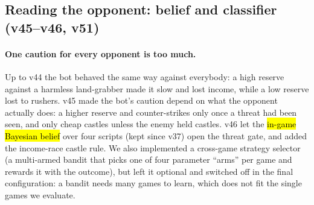 \subsection{Reading the opponent: belief and classifier (v45--v46, v51)}

\paragraph{One caution for every opponent is too much.} Up to v44 the bot behaved the same way against everybody:
a high reserve against a harmless land-grabber made it slow and lost income, while a low reserve lost to rushers.
v45 made the bot's caution depend on what the opponent actually does: a higher reserve and counter-strikes only
once a threat had been seen, and only cheap castles unless the enemy held castles. v46 let the \hl{in-game
Bayesian belief} over four scripts (kept since v37) open the threat gate, and added the income-race castle rule. We also implemented a cross-game strategy
selector (a multi-armed bandit that picks one of four parameter ``arms'' per game and rewards it with the
outcome), but left it optional and switched off in the final configuration: a bandit needs many games to learn,
which does not fit the single games we evaluate.

